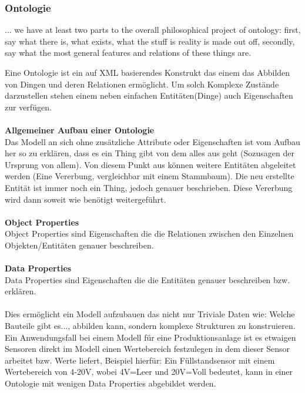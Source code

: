 \subsubsection{Ontologie}
\begin{displayquote}... we have at least two parts to the overall philosophical project of ontology: first, say what there is, what exists, what the stuff is reality is made out off, secondly, say what the most general features and relations of these things are.
\end{displayquote}
Eine Ontologie ist ein auf XML basierendes Konstrukt das einem das Abbilden von Dingen und deren Relationen ermöglicht. Um solch Komplexe Zustände darzustellen stehen einem neben einfachen Entitäten(Dinge) auch Eigenschaften zur verfügen.\\
\\
\textbf{Allgemeiner Aufbau einer Ontologie}\\
Das Modell an sich ohne zusätzliche Attribute oder Eigenschaften ist vom Aufbau her so zu erklären, dass es ein Thing gibt von dem alles aus geht (Sozusagen der Ursprung von allem). Von diesem Punkt aus können weitere Entitäten abgeleitet werden (Eine Vererbung, vergleichbar mit einem Stammbaum). Die neu erstellte Entität ist immer noch ein Thing, jedoch genauer beschrieben. Diese Vererbung wird dann soweit wie benötigt weitergeführt.\\
\\
\textbf{Object Properties}\\
Object Properties sind Eigenschaften die die Relationen zwischen den Einzelnen Objekten/Entitäten genauer beschreiben.\\ 
\\
\textbf{Data Properties}\\
Data Properties sind Eigenschaften die die Entitäten genauer beschreiben bzw. erklären. 
\\
\\
Dies ermöglicht ein Modell aufzubauen das nicht nur Triviale Daten wie: Welche Bauteile gibt es..., abbilden kann, sondern komplexe Strukturen zu konstruieren. Ein Anwendungsfall bei einem Modell für eine Produktionsanlage ist es etwaigen Sensoren direkt im Modell einen Wertebereich festzulegen in dem dieser Sensor arbeitet bzw. Werte liefert, Beispiel hierfür: Ein Füllstandsensor mit einem Wertebereich von 4-20V, wobei 4V=Leer und 20V=Voll bedeutet, kann in einer Ontologie mit wenigen Data Properties abgebildet werden.
